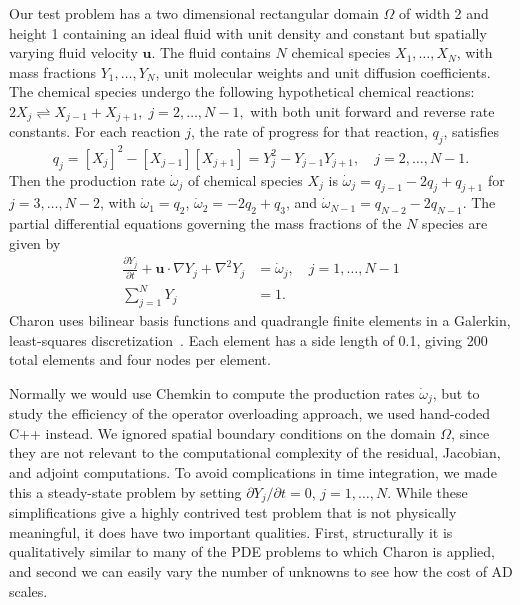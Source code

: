 \documentclass{llncs}
\begin{document}
Our test problem has
a two dimensional rectangular domain $\Omega$ of width 2 and
height 1 containing an ideal fluid with unit density and
constant but spatially varying fluid velocity $\mathbf{u}$.  The fluid
contains $N$ chemical species $X_1,\dots,X_N$, with mass fractions
$Y_1,\dots,Y_N$, unit molecular weights and unit diffusion
coefficients.  The chemical
species undergo the following hypothetical chemical reactions:
\begin{math}
  2 X_j \rightleftharpoons X_{j-1} + X_{j+1}, \; j=2,\dots,N-1,
\end{math}
with both unit forward and reverse rate constants.  For each reaction $j$,
the rate of progress for that reaction, $q_j$, satisfies
\begin{displaymath}
  q_j = [X_j]^2 - [X_{j-1}][X_{j+1}] = Y_j^2 - Y_{j-1}Y_{j+1}, \quad
  j=2,\dots,N-1.
\end{displaymath}
Then the production rate
$\dot{\omega}_j$ of chemical species $X_j$ is
$\dot{\omega}_j = q_{j-1} - 2 q_j + q_{j+1}$ for $j=3,\dots,N-2$,
with $\dot{\omega}_1 = q_2$, $\dot{\omega}_2 = -2 q_2 + q_3$, and
$\dot{\omega}_{N-1} = q_{N-2} - 2 q_{N-1}$.
The partial differential equations governing the
mass fractions of the $N$ species are given by
\begin{equation}
\label{eq:pde}
\begin{split}
  \frac{\partial Y_j}{\partial t} + \mathbf{u}\cdot\nabla Y_j +
  \nabla^2 Y_j &= \dot{\omega}_j, \quad j=1,\dots,N-1 \\
  \sum_{j=1}^N Y_j &= 1.
\end{split}
\end{equation}
Charon uses bilinear
basis functions and quadrangle finite elements in a
Galerkin,
least-squares discretization~\cite{hufh:89}.
Each element has a side
length of 0.1, giving 200 total elements and four nodes per element.

Normally we would use
Chemkin to compute the production rates
$\dot{\omega}_j$, but to study the
efficiency of the operator overloading approach, we used hand-coded C++
instead.
We ignored spatial boundary conditions on the domain $\Omega$, since
they are not
relevant to the computational complexity of the
residual, Jacobian, and adjoint computations.  To avoid complications
in time integration, we made
this a steady-state problem by setting $\partial Y_j/\partial t = 0$,
$j=1,\dots,N$.  While these simplifications give a highly contrived test problem that is not
physically meaningful, it does have two important qualities.  First,
structurally it is qualitatively similar to many of the PDE problems
to which Charon is applied, and second we can easily vary
the number of unknowns to see how the cost of AD scales.
\end{document}
